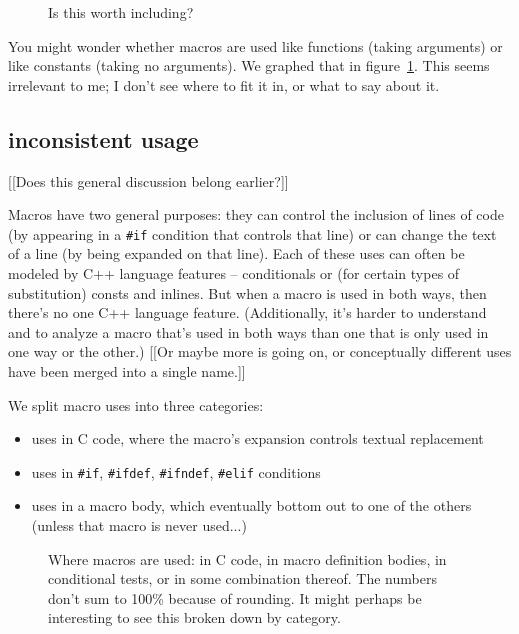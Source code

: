 \documentclass[10pt]{article}
\begin{document}
\begin{figure}
\centerline{}
\caption{Is this worth including?}
\label{fig:cat-numargs}
\end{figure}

You might wonder whether macros are used like functions (taking arguments)
or like constants (taking no arguments).  We graphed that in
figure~\ref{fig:cat-numargs}.  This seems irrelevant to me; I don't see
where to fit it in, or what to say about it.

\subsection{inconsistent usage}

[[Does this general discussion belong earlier?]]

Macros have two general purposes: they can control the inclusion of lines
of code (by appearing in a {\tt \#if} condition that controls that line) or
can change the text of a line (by being expanded on that line).  Each of
these uses can often be modeled by C++ language features -- conditionals or
(for certain types of substitution) consts and inlines.  But when a macro
is used in both ways, then there's no one C++ language feature.
(Additionally, it's harder to understand and to analyze a macro that's used
in both ways than one that is only used in one way or the other.)
[[Or maybe more is going on, or conceptually different uses have been
merged into a single name.]]

    We split macro uses into three categories:  
\begin{itemize}
\item
  uses in C code, where the macro's expansion controls textual
            replacement
\item
  uses in {\tt \#if}, {\tt \#ifdef}, {\tt \#ifndef}, {\tt \#elif} conditions
\item
  uses in a macro body, which eventually bottom out to one of the
            others (unless that macro is never used...)
\end{itemize}

\begin{figure}
{\small
  \setlength{\tabcolsep}{.25em}
}
\caption{Where macros are used: in C code, in macro definition bodies, in
  conditional tests, or in some combination thereof.  The numbers don't sum to
  100\% because of rounding.  It might perhaps be interesting to see this
  broken down by category.}
\label{fig:where-used}
\end{figure}
\end{document}
